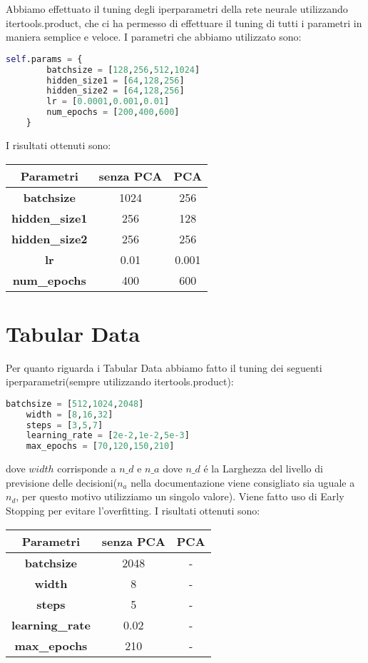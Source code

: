 \documentclass[../../Report.tex]{subfiles}
\begin{document}
Abbiamo effettuato il tuning degli iperparametri della rete neurale utilizzando itertools.product, che ci ha permesso di effettuare il tuning di tutti i parametri in maniera semplice e veloce.
I parametri che abbiamo utilizzato sono:
\begin{lstlisting}[language=python]
    self.params = {
        batchsize = [128,256,512,1024]	
        hidden_size1 = [64,128,256]
        hidden_size2 = [64,128,256]
        lr = [0.0001,0.001,0.01]
        num_epochs = [200,400,600]
    }
\end{lstlisting}
I risultati ottenuti sono:
\begin{table}[h]
    \centering
    \begin{tabular}{|c|c|c|}
    \hline
\textbf{Parametri} & \textbf{senza PCA} & \textbf{PCA} \\ \hline
\textbf{batchsize}& 1024 & 256\\
\textbf{hidden\_size1}& 256 &  128 \\
\textbf{hidden\_size2}& 256 & 256\\
\textbf{lr}& 0.01 &  0.001\\
\textbf{num\_epochs}& 400 & 600\\
\hline
\end{tabular}
\end{table}

\section{Tabular Data}
Per quanto riguarda i Tabular Data abbiamo fatto il tuning dei seguenti iperparametri(sempre utilizzando itertools.product):
\begin{lstlisting}[language=Python]
    batchsize = [512,1024,2048]
    width = [8,16,32]
    steps = [3,5,7]
    learning_rate = [2e-2,1e-2,5e-3]    
    max_epochs = [70,120,150,210]
\end{lstlisting}
dove $width$ corrisponde a $n\_d$ e $n\_a$ dove $n\_d$ é la Larghezza del livello di previsione delle decisioni($n_a$ nella documentazione viene consigliato sia uguale a $n_d$, per questo motivo utilizziamo un singolo valore).
Viene fatto uso di Early Stopping per evitare l'overfitting.
I risultati ottenuti sono:
\begin{table}[h]
    \centering
    \begin{tabular}{|c|c|c|}
    \hline
\textbf{Parametri} & \textbf{senza PCA} & \textbf{PCA} \\ \hline
\textbf{batchsize}& 2048 & -\\
\textbf{width}& 8 &  - \\
\textbf{steps}& 5 & -\\
\textbf{learning\_rate}& 0.02 &  -\\
\textbf{max\_epochs}& 210 & -\\
\hline
\end{tabular}
\end{table}
\end{document}
